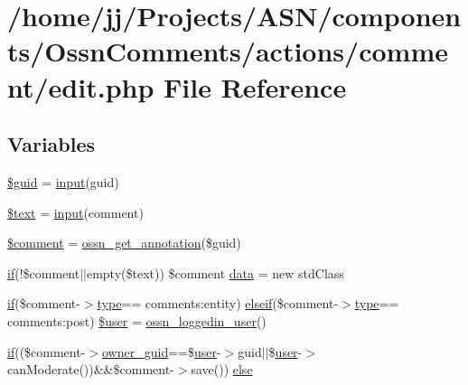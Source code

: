 \hypertarget{components_2_ossn_comments_2actions_2comment_2edit_8php}{}\section{/home/jj/\+Projects/\+A\+S\+N/components/\+Ossn\+Comments/actions/comment/edit.php File Reference}
\label{components_2_ossn_comments_2actions_2comment_2edit_8php}
\subsection*{Variables}
\begin{DoxyCompactItemize}
\item 
\hyperlink{components_2_ossn_comments_2actions_2comment_2edit_8php_af99126304cbcb2e1483892c40bb3aae4}{\$guid} = \hyperlink{ossn_8lib_8input_8php_a64ebee98b041c4f75f71ed3cd73cc8ed}{input}(\textquotesingle{}guid\textquotesingle{})
\item 
\hyperlink{components_2_ossn_comments_2actions_2comment_2edit_8php_adf95f30eaafccead90ab5e2cdb55e9b9}{\$text} = \hyperlink{ossn_8lib_8input_8php_a64ebee98b041c4f75f71ed3cd73cc8ed}{input}(\textquotesingle{}comment\textquotesingle{})
\item 
\hyperlink{components_2_ossn_comments_2actions_2comment_2edit_8php_a536677acc0163c53c067316a97456e6c}{\$comment} = \hyperlink{ossn_8lib_8annotations_8php_a40a5027fa5571b7c4e4bd35794c76ac3}{ossn\+\_\+get\+\_\+annotation}(\$guid)
\item 
\hyperlink{jquery_8tokeninput_8js_ad8dd46a3cbc004569e34401e9e71771a}{if}(!\$comment$\vert$$\vert$empty(\$text)) \$comment \hyperlink{components_2_ossn_comments_2actions_2comment_2edit_8php_a2b67189b42ab547221cb2a6408f4746a}{data} = new std\+Class
\item 
\hyperlink{jquery_8tokeninput_8js_ad8dd46a3cbc004569e34401e9e71771a}{if}(\$comment-\/$>$\hyperlink{_ossn_wall_2actions_2wall_2post_2group_8php_a2dc1bb4e1ed0029daa81ac0776b14b51}{type}== \textquotesingle{}comments\+:entity\textquotesingle{}) \hyperlink{cache__settings_8php_aac633c7b6b07fcf67f4504fb5c57a856}{elseif}(\$comment-\/$>$\hyperlink{_ossn_wall_2actions_2wall_2post_2group_8php_a2dc1bb4e1ed0029daa81ac0776b14b51}{type}== \textquotesingle{}comments\+:post\textquotesingle{}) \hyperlink{components_2_ossn_comments_2actions_2comment_2edit_8php_a03177e81750f5daa5f640386753f2bac}{\$user} = \hyperlink{ossn_8lib_8users_8php_aa3c8068d0e6638b414d6a2f6c62565b8}{ossn\+\_\+loggedin\+\_\+user}()
\item 
\hyperlink{jquery_8tokeninput_8js_ad8dd46a3cbc004569e34401e9e71771a}{if}((\$comment-\/$>$\hyperlink{user_8php_a307051fefc937afd02c509c55646f50b}{owner\+\_\+guid}==\$\hyperlink{ossn_8config_8db_8example_8php_a802544b7ba9f79bbf24ef67773d53bed}{user}-\/$>$guid$\vert$$\vert$\$\hyperlink{ossn_8config_8db_8example_8php_a802544b7ba9f79bbf24ef67773d53bed}{user}-\/$>$can\+Moderate())\&\&\$comment-\/$>$save()) \hyperlink{components_2_ossn_comments_2actions_2comment_2edit_8php_ad15aa746af6df58f5a69621972c6aee7}{else}
\end{DoxyCompactItemize}


